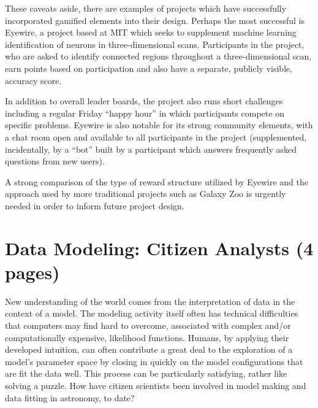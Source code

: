 \documentclass{ar2e}
\begin{document}
These caveats aside, there are examples of projects which have successfully
incorporated gamified elements into their design. Perhaps the most successful
is Eyewire, a project based at MIT which seeks to supplement machine learning
identification of neurons in three-dimensional scans. Participants in the
project, who are asked to identify connected regions throughout a
three-dimensional scan, earn points based on participation and also have a
separate, publicly visible, accuracy score. 


In addition to overall leader
boards, the project also runs short challenges including a regular Friday
``happy hour'' in which participants compete on specific problems. Eyewire is
also notable for its strong community elements, with a chat room open and
available to all participants in the project (supplemented, incidentally, by a
``bot'' built by a participant which answers frequently asked questions from new
users). 


A strong comparison of the type of reward structure utilized by
Eyewire and the approach used by more traditional projects such as Galaxy Zoo
is urgently needed in order to inform future project design. 



\section{Data Modeling: Citizen Analysts (4 pages)}
\label{sec:model}

New understanding of the world comes from the interpretation of data in the
context of a model. The modeling activity itself often has technical
difficulties that computers may find hard to overcome, associated with complex
and/or computationally expensive, likelihood functions. Humans, by applying
their developed intuition, can often contribute a great deal to the
exploration of a model's parameter space by closing in quickly on the model
configurations that are fit the data well. This process can be particularly
satisfying, rather like solving a puzzle. How have citizen scientists been
involved in model making and data fitting in astronomy, to date?


\end{document}
